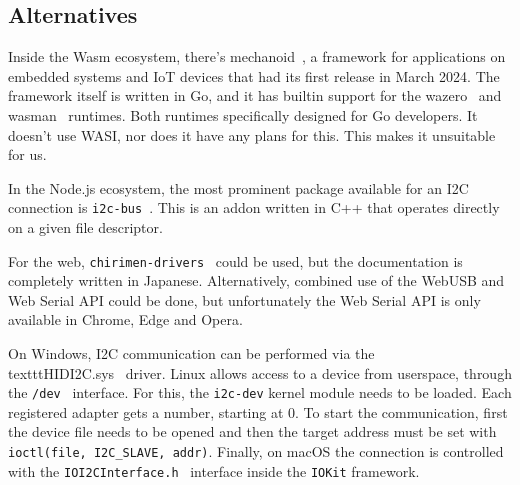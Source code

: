 \subsection{Alternatives}


Inside the \gls{Wasm} ecosystem, there's mechanoid~\cite{mechanoid}, a framework for applications on embedded systems and \gls{IoT} devices that had its first release in March 2024. The framework itself is written in Go, and it has builtin support for the wazero~\cite{wazero} and wasman~\cite{gh:wasman} runtimes. Both runtimes specifically designed for Go developers. It doesn't use \gls{WASI}, nor does it have any plans for this. This makes it unsuitable for us.

In the Node.js ecosystem, the most prominent package available for an \gls{I2C} connection is \texttt{i2c-bus}~\cite{gh:i2c-bus}. This is an addon written in C++ that operates directly on a given file descriptor.

For the web, \texttt{chirimen-drivers}~\cite{chirimen} could be used, but the documentation is completely written in Japanese. Alternatively, combined use of the WebUSB and Web Serial \gls{API} could be done, but unfortunately the Web Serial \gls{API} is only available in Chrome, Edge and Opera.

On Windows, \gls{I2C} communication can be performed via the \\texttt{HIDI2C.sys}~\cite{windows:i2c} driver. Linux allows access to a device from userspace, through the \texttt{/dev}~\cite{linux:i2c} interface. For this, the \texttt{i2c-dev} kernel module needs to be loaded. Each registered adapter gets a number, starting at 0. To start the communication, first the device file needs to be opened and then the target address must be set with \texttt{ioctl(file, I2C\_SLAVE, addr)}. Finally, on macOS the connection is controlled with the \texttt{IOI2CInterface.h}~\cite{macos:i2c} interface inside the \texttt{IOKit} framework.

